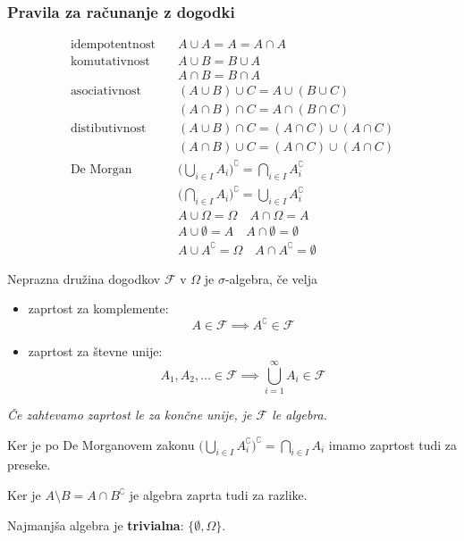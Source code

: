\begin{multicols}{5}
\subsubsection{Pravila za računanje z dogodki}
\begin{align*}
	\text{idempotentnost} & \quad A \cup A = A = A \cap A \\
	\text{komutativnost} & \quad A \cup B = B \cup A \\
	& \quad A \cap B = B \cap A \\
	\text{asociativnost} & \quad (A \cup B) \cup C = A \cup ( B \cup C) \\
	& \quad (A \cap B) \cap C = A \cap ( B \cap C) \\
	\text{distibutivnost} & \quad (A \cup B) \cap C = (A \cap C) \cup ( A \cap C) \\
	& \quad (A \cap B) \cup C = (A \cap C) \cup ( A \cap C) \\
	\text{De Morgan} & \quad \big(\bigcup_{i\in I} A_i \big)^\complement = \bigcap_{i \in I} A_i^\complement  \\
	& \quad \big(\bigcap_{i\in I} A_i \big)^\complement = \bigcup_{i \in I} A_i^\complement \\
	& \quad A \cup \Omega = \Omega \quad  A \cap \Omega = A \\
	& \quad A \cup \emptyset = A \quad  A \cap \emptyset = \emptyset \\
	& \quad A \cup A^\complement = \Omega \quad A \cap A^\complement = \emptyset
\end{align*}


Neprazna družina dogodkov $\mathcal{F}$ v $\Omega$ je $\sigma$-algebra, če velja
\begin{itemize}
	\item zaprtost za komplemente: \[ A \in \mathcal{F} \implies A^\complement \in \mathcal{F} \]
	\item zaprtost za števne unije: \[ A_1, A_2, \dots \in \mathcal{F} \implies \bigcup_{i=1}^\infty A_i \in \mathcal{F} \]
\end{itemize}
\textit{Če zahtevamo zaprtost le za končne unije, je $\mathcal{F}$ le algebra.}

Ker je po De Morganovem zakonu $\big(\bigcup_{i\in I} A_i^\complement \big)^\complement = \bigcap_{i \in I} A_i$ imamo zaprtost tudi za preseke.

Ker je $A \setminus B = A \cap B^\complement$ je algebra zaprta tudi za razlike.

Najmanjša algebra je \textbf{trivialna}: $ \{ \emptyset, \Omega \}$.


\end{multicols}
